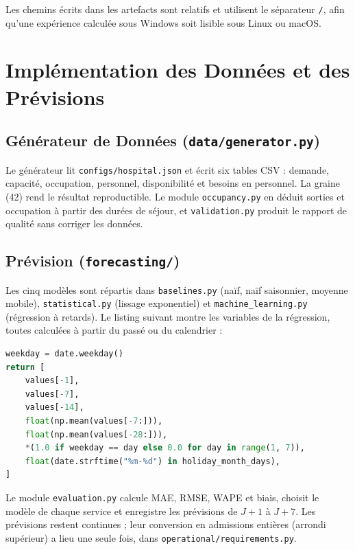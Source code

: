 Les chemins écrits dans les artefacts sont relatifs et utilisent le séparateur \texttt{/}, afin qu'une expérience calculée sous Windows soit lisible sous Linux ou macOS.

\section{Implémentation des Données et des Prévisions}

\subsection{Générateur de Données (\texttt{data/generator.py})}
Le générateur lit \texttt{configs/hospital.json} et écrit six tables CSV : demande, capacité, occupation, personnel, disponibilité et besoins en personnel. La graine (42) rend le résultat reproductible. Le module \texttt{occupancy.py} en déduit sorties et occupation à partir des durées de séjour, et \texttt{validation.py} produit le rapport de qualité sans corriger les données.

\subsection{Prévision (\texttt{forecasting/})}
Les cinq modèles sont répartis dans \texttt{baselines.py} (naïf, naïf saisonnier, moyenne mobile), \texttt{statistical.py} (lissage exponentiel) et \texttt{machine\_learning.py} (régression à retards). Le listing suivant montre les variables de la régression, toutes calculées à partir du passé ou du calendrier :

\begin{lstlisting}[language=Python, caption={Variables explicatives de la régression à retards (extrait de \texttt{machine\_learning.py}).}]
weekday = date.weekday()
return [
    values[-1],
    values[-7],
    values[-14],
    float(np.mean(values[-7:])),
    float(np.mean(values[-28:])),
    *(1.0 if weekday == day else 0.0 for day in range(1, 7)),
    float(date.strftime("%m-%d") in holiday_month_days),
]
\end{lstlisting}

Le module \texttt{evaluation.py} calcule MAE, RMSE, WAPE et biais, choisit le modèle de chaque service et enregistre les prévisions de $J+1$ à $J+7$. Les prévisions restent continues ; leur conversion en admissions entières (arrondi supérieur) a lieu une seule fois, dans \texttt{operational/requirements.py}.

